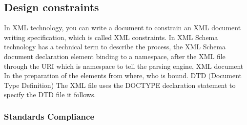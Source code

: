 \subsection{Design constraints}

In XML technology, you can write a document to constrain an XML document writing specification, which is called XML constraints.
In XML Schema technology has a technical term to describe the process, the XML Schema document declaration element binding to a namespace, after the XML file through the URI which is namespace to tell the parsing engine, XML document In the preparation of the elements from where, who is bound.
DTD (Document Type Definition)
The XML file uses the DOCTYPE declaration statement to specify the DTD file it follows.



\subsubsection{Standards Compliance}

